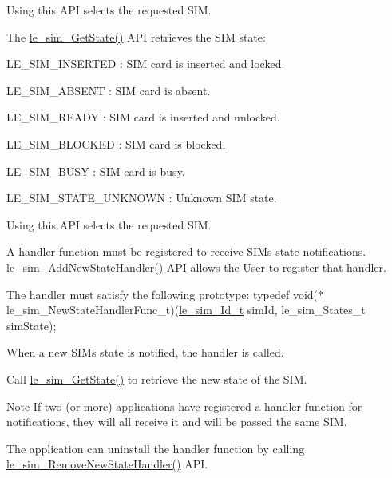 Using this A\+PI selects the requested S\+IM.

The \hyperlink{le__sim__interface_8h_a16b06f266471d81f772e5439ec570144}{le\+\_\+sim\+\_\+\+Get\+State()} A\+PI retrieves the S\+IM state\+:
\begin{DoxyItemize}
\item L\+E\+\_\+\+S\+I\+M\+\_\+\+I\+N\+S\+E\+R\+T\+ED \+: S\+IM card is inserted and locked.
\item L\+E\+\_\+\+S\+I\+M\+\_\+\+A\+B\+S\+E\+NT \+: S\+IM card is absent.
\item L\+E\+\_\+\+S\+I\+M\+\_\+\+R\+E\+A\+DY \+: S\+IM card is inserted and unlocked.
\item L\+E\+\_\+\+S\+I\+M\+\_\+\+B\+L\+O\+C\+K\+ED \+: S\+IM card is blocked.
\item L\+E\+\_\+\+S\+I\+M\+\_\+\+B\+U\+SY \+: S\+IM card is busy.
\item L\+E\+\_\+\+S\+I\+M\+\_\+\+S\+T\+A\+T\+E\+\_\+\+U\+N\+K\+N\+O\+WN \+: Unknown S\+IM state.
\end{DoxyItemize}

Using this A\+PI selects the requested S\+IM.

A handler function must be registered to receive S\+IM\textquotesingle{}s state notifications. \hyperlink{le__sim__interface_8h_a8e296a7cd35edd99cb1dc21232e280dd}{le\+\_\+sim\+\_\+\+Add\+New\+State\+Handler()} A\+PI allows the User to register that handler.

The handler must satisfy the following prototype\+: typedef void($\ast$le\+\_\+sim\+\_\+\+New\+State\+Handler\+Func\+\_\+t)(\hyperlink{le__sim__interface_8h_aace49df88426119626fb1ef4e544ccdd}{le\+\_\+sim\+\_\+\+Id\+\_\+t} sim\+Id, {\ttfamily le\+\_\+sim\+\_\+\+States\+\_\+t} sim\+State);

When a new S\+IM\textquotesingle{}s state is notified, the handler is called.

Call \hyperlink{le__sim__interface_8h_a16b06f266471d81f772e5439ec570144}{le\+\_\+sim\+\_\+\+Get\+State()} to retrieve the new state of the S\+IM.

\begin{DoxyNote}{Note}
If two (or more) applications have registered a handler function for notifications, they will all receive it and will be passed the same S\+IM.
\end{DoxyNote}
The application can uninstall the handler function by calling \hyperlink{le__sim__interface_8h_a0286578e9aa46ba864df1878263b9f84}{le\+\_\+sim\+\_\+\+Remove\+New\+State\+Handler()} A\+PI.

